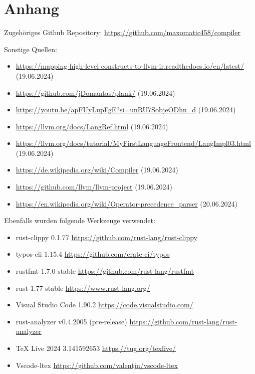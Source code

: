 \section{Anhang}

    Zugehöriges Github Repository: \url{https://github.com/maxomatic458/compiler}
    

    \noindent Sonstige Quellen:
    \begin{itemize}
        \item \url {https://mapping-high-level-constructs-to-llvm-ir.readthedocs.io/en/latest/} (19.06.2024)
        \item \url {https://github.com/jDomantas/plank/} (19.06.2024)
        \item \url {https://youtu.be/apFUyLupFgE?si=unRU7SobjeODhn_d} (19.06.2024)
        \item \url {https://llvm.org/docs/LangRef.html} (19.06.2024)
        \item \url {https://llvm.org/docs/tutorial/MyFirstLanguageFrontend/LangImpl03.html} (19.06.2024)
        \item \url {https://de.wikipedia.org/wiki/Compiler} (19.06.2024)
        \item \url {https://github.com/llvm/llvm-project} (19.06.2024)
        \item \url {https://en.wikipedia.org/wiki/Operator-precedence_parser} (20.06.2024)
    \end{itemize}

    \noindent Ebenfalls wurden folgende Werkzeuge verwendet:
    \begin{itemize}
        \item rust-clippy 0.1.77 \url{https://github.com/rust-lang/rust-clippy}
        \item typos-cli 1.15.4 \url{https://github.com/crate-ci/typos}
        \item rustfmt 1.7.0-stable \url{https://github.com/rust-lang/rustfmt}
        \item rust 1.77 stable \url{https://www.rust-lang.org/}
        \item Visual Studio Code 1.90.2 \url{https://code.visualstudio.com/}
        \item rust-analyzer v0.4.2005 (pre-release) \url{https://github.com/rust-lang/rust-analyzer}
        \item TeX Live 2024 3.141592653 \url{https://tug.org/texlive/}
        \item Vscode-ltex \url{https://github.com/valentjn/vscode-ltex}
    \end{itemize}

